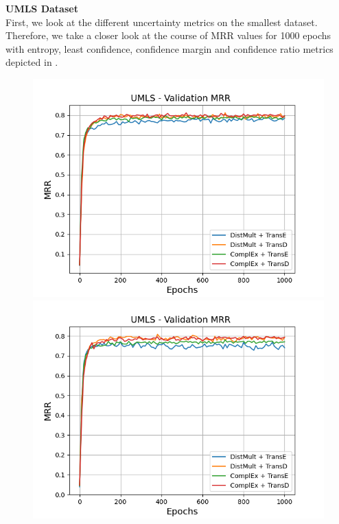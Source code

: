 \textbf{UMLS Dataset}
\label{subsubsec:metrics_umls}\\
%
First, we look at the different uncertainty metrics on the smallest \umls dataset.
Therefore, we take a closer look at the course of MRR values for 1000 epochs with entropy, least confidence, confidence margin and confidence ratio metrics depicted in .
\begin{figure}[H]
    \centering
    \begin{minipage}{.5\textwidth}
      \centering
      \includegraphics[width=0.9\linewidth]{figures/results/gan_train/not_pretrained/uncertainty/max_distribution/entropy/umls/1k_epochs/uncertainty_umls_mrrs.png}
    \end{minipage}%
    \begin{minipage}{.5\textwidth}
      \centering
      \includegraphics[width=0.9\linewidth]{figures/results/gan_train/not_pretrained/uncertainty/max_distribution/least_confidence/umls/uncertainty_umls_mrrs.png}

\end{minipage}
\end{figure}
